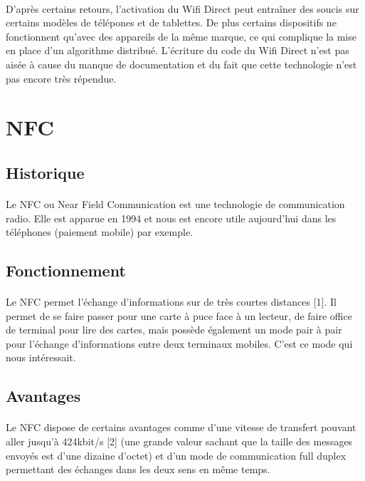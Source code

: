 \documentclass[a4paper,10pt]{report}
\begin{document}
    \paragraph{}
    D'après certains retours, l'activation du Wifi Direct peut entraîner des soucis sur certains modèles de télépones et de tablettes. De plus certains dispositifs ne fonctionnent qu'avec des appareils de la même marque, ce qui complique la mise en place d'un algorithme distribué.
    L'écriture du code du Wifi Direct n'est pas aisée à cause du manque de documentation et du fait que cette technologie n'est pas encore très répendue.
  \section{NFC}
    \subsection{Historique}
     \paragraph{}
     Le NFC ou Near Field Communication est une technologie de communication radio. Elle est apparue en 1994 et nous est encore utile aujourd'hui dans les téléphones (paiement mobile) par exemple.
    \subsection{Fonctionnement}
     \paragraph{}
     Le NFC permet l'échange d'informations sur de très courtes distances [1]. Il permet de se faire passer pour une carte à puce face à un lecteur, de faire office de terminal pour lire des cartes, mais possède également un mode pair à pair pour l'échange d'informations entre deux terminaux mobiles. C'est ce mode qui nous intéressait.
    \subsection{Avantages}
    \paragraph{}
    Le NFC dispose de certains avantages comme d'une vitesse de transfert pouvant aller jusqu'à 424kbit/s [2] (une grande valeur sachant que la taille des messages envoyés est d'une dizaine d'octet) et d'un mode de communication full duplex permettant des échanges dans les deux sens en même temps.
\end{document}

